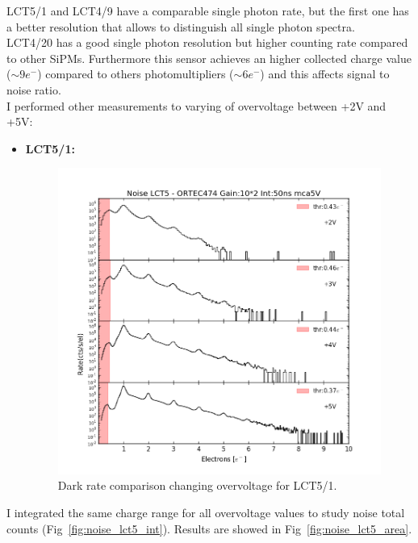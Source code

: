 \documentclass[10pt,a4paper, openany]{book}
\begin{document}
LCT5/1 and LCT4/9 have a comparable single photon rate, but the first one has a better resolution that allows to distinguish all single photon spectra.\\
LCT4/20 has a good single photon resolution but higher counting rate compared to other SiPMs. Furthermore this sensor achieves an higher collected charge value ($\sim 9e^-$) compared to others photomultipliers ($\sim 6e^-$) and this affects signal to noise ratio.\\
I performed other measurements to varying of overvoltage between +2V and +5V:
\begin{itemize}
\item \textbf{LCT5/1:}

\begin{figure}[!h]
\begin{center}
\includegraphics[scale=0.6]{imm/noise_lct5.png}
\end{center}
\caption{Dark rate comparison changing overvoltage for LCT5/1.} 
\label{fig:noise_lct5}
\end{figure}
\end{itemize}

I integrated the same charge range for all overvoltage values to study noise total counts (Fig~\ref{fig:noise_lct5_int}). Results are showed in Fig~\ref{fig:noise_lct5_area}.

\newpage
\end{document}
